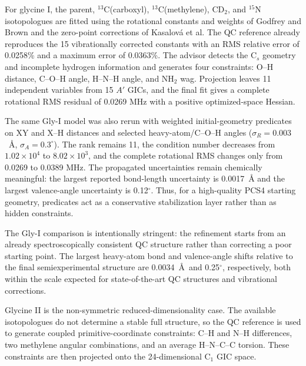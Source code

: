 \documentclass[aip,jcp,reprint,longbibliography,floatfix]{revtex4-2}
\begin{document}
For glycine I, the parent, $^{13}$C(carboxyl), $^{13}$C(methylene), CD$_2$,
and $^{15}$N isotopologues are fitted using the rotational constants and
weights of Godfrey and Brown\cite{GodfreyBrown1995ShapeGlycine} and the
zero-point corrections of Kasalov{\'a} et al.\cite{Kasalova2007Glycine} The
QC reference already reproduces the 15 vibrationally corrected constants
with an RMS relative error of 0.0258\% and a maximum error of 0.0363\%. The
advisor detects the C$_s$ geometry and incomplete hydrogen information and
generates four constraints: O--H distance, C--O--H angle, H--N--H angle, and
NH$_2$ wag. Projection leaves 11 independent variables from 15 $A'$ GICs, and
the final fit gives a complete rotational RMS residual of 0.0269 MHz with a
positive optimized-space Hessian.



The same Gly-I model was also rerun with weighted initial-geometry predicates
on XY and X--H distances and selected heavy-atom/C--O--H angles
($\sigma_R=0.003$~\AA{}, $\sigma_A=0.3^\circ$). The rank remains 11, the
condition number decreases from $1.02\times10^4$ to $8.02\times10^3$, and the
complete rotational RMS changes only from 0.0269 to 0.0389 MHz. The propagated
uncertainties remain chemically meaningful: the largest reported bond-length
uncertainty is 0.0017~\AA{} and the largest valence-angle uncertainty is
0.12$^\circ$. Thus, for a high-quality PCS4 starting geometry, predicates act
as a conservative stabilization layer rather than as hidden constraints.

The Gly-I comparison is intentionally stringent: the refinement starts from an
already spectroscopically consistent QC structure rather than correcting a poor
starting point. The largest heavy-atom bond and valence-angle shifts relative
to the final semiexperimental structure are 0.0034~\AA\ and 0.25$^\circ$,
respectively, both within the scale expected for state-of-the-art QC structures
and vibrational corrections.\cite{PuzzariniStanton2023,Mendolicchio2025FastDvib}

Glycine II is the non-symmetric reduced-dimensionality case. The available
isotopologues do not determine a stable full structure, so the QC reference
is used to generate coupled primitive-coordinate constraints: C--H and N--H
differences, two methylene angular combinations, and an average H--N--C--C
torsion. These constraints are then projected onto the
24-dimensional C$_1$ GIC space.
\end{document}
